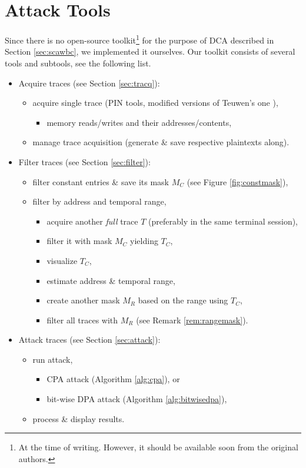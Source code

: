 \section{Attack Tools}
\label{sec:tools}

Since there is no open-source toolkit\footnote{At the time of writing. However, it should be available soon from the original authors.} for the purpose of DCA described in Section \ref{sec:scawbc}, we implemented it ourselves. Our toolkit consists of several tools and subtools, see the following list.


\begin{itemize}
	\item Acquire traces (see Section \ref{sec:tracq}):
	\begin{itemize}
		\item acquire single trace (PIN tools, modified versions of Teuwen's one \cite{teuwen2015movfuscator}),
		\begin{itemize}
			\item memory reads/writes and their addresses/contents,
		\end{itemize}
		\item manage trace acquisition (generate \& save respective plaintexts along).
	\end{itemize}
	\item Filter traces (see Section \ref{sec:filter}):
	\begin{itemize}
		\item filter constant entries \& save its mask $M_C$ (see Figure \ref{fig:constmask}),
		\item filter by address and temporal range,
		\begin{itemize}
			\item acquire another {\em full} trace $T$ (preferably in the same terminal session),
			\item filter it with mask $M_C$ yielding $T_C$,
			\item visualize $T_C$,
			\item estimate address \& temporal range,
			\item create another mask $M_R$ based on the range using $T_C$,
			\item filter all traces with $M_R$ (see Remark \ref{rem:rangemask}).
		\end{itemize}
	\end{itemize}
	\item Attack traces (see Section \ref{sec:attack}):
	\begin{itemize}
		\item run attack,
		\begin{itemize}
			\item CPA attack (Algorithm \ref{alg:cpa}), or
			\item bit-wise DPA attack (Algorithm \ref{alg:bitwisedpa}),
		\end{itemize}
		\item process \& display results.
	\end{itemize}
\end{itemize}
